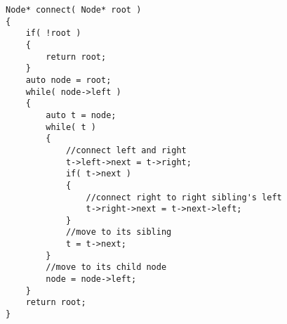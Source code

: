 \setcounter{lstlisting}{0}
\begin{lstlisting}[style=customc, caption={Iterative}]
Node* connect( Node* root )
{
    if( !root )
    {
        return root;
    }
    auto node = root;
    while( node->left )
    {
        auto t = node;
        while( t )
        {
            //connect left and right
            t->left->next = t->right;
            if( t->next )
            {
                //connect right to right sibling's left
                t->right->next = t->next->left;
            }
            //move to its sibling
            t = t->next;
        }
        //move to its child node
        node = node->left;
    }
    return root;
}
\end{lstlisting}
